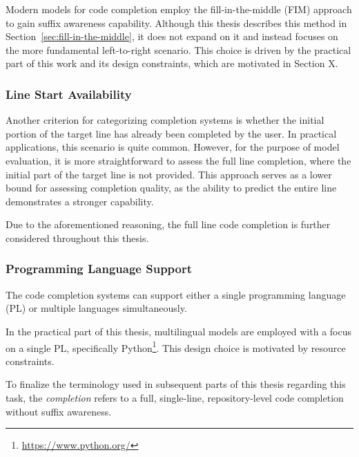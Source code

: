 Modern models for code completion employ the fill-in-the-middle (FIM) approach to gain suffix awareness capability. Although this thesis describes this method in Section~\ref{sec:fill-in-the-middle}, it does not expand on it and instead focuses on the more fundamental left-to-right scenario. This choice is driven by the practical part of this work and its design constraints, which are motivated in Section X.  %

\subsubsection*{Line Start Availability}

Another criterion for categorizing completion systems is whether the initial portion of the target line has already been completed by the user. In practical applications, this scenario is quite common. However, for the purpose of model evaluation, it is more straightforward to assess the full line completion, where the initial part of the target line is not provided. This approach serves as a lower bound for assessing completion quality, as the ability to predict the entire line demonstrates a stronger capability.

Due to the aforementioned reasoning, the full line code completion is further considered throughout this thesis.

\subsubsection*{Programming Language Support}

The code completion systems can support either a single programming language (PL) or multiple languages simultaneously.

In the practical part of this thesis, multilingual models are employed with a focus on a single PL, specifically Python\footnote{\url{https://www.python.org/}}. This design choice is motivated by resource constraints.
\medskip

To finalize the terminology used in subsequent parts of this thesis regarding this task, the \textit{completion} refers to a full, single-line, repository-level code completion without suffix awareness.
